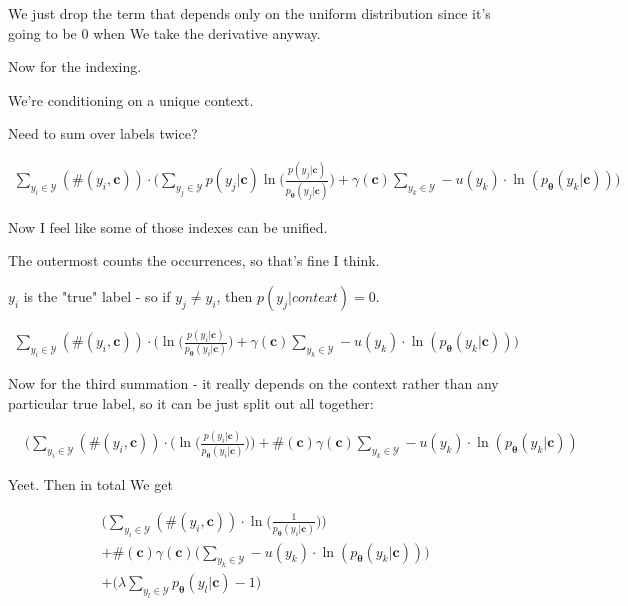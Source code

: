 \documentclass{article}
\newcommand{\vtheta}{\boldsymbol{\theta}}
\newcommand{\model}{p_{\vtheta}}
\newcommand{\context}{\boldsymbol{c}}
\begin{document}
		We just drop the term that depends only on the uniform distribution since it's going to be 0 when We take the derivative anyway.
		
		Now for the indexing. 
		
		We're conditioning on a unique context.
		
		Need to sum over labels twice?
		
		\begin{align}
			\sum_{y_i\in\mathcal{Y}} (\#(y_i, \context))\cdot \bigg( \sum_{y_j\in\mathcal{Y}} p(y_j|\context)\ln\bigg(\frac{p(y_j|\context)}{\model(y_j|\context)} \bigg) + \gamma(\context)\sum_{y_k\in\mathcal{Y}} - u(y_k)\cdot\ln(\model(y_k|\context)) \bigg)
		\end{align}	
		
		Now I feel like some of those indexes can be unified.
		
		The outermost counts the occurrences, so that's fine I think.
		
		$y_i$ is the "true" label - so if $y_j\neq y_i$, then $p(y_j|context) = 0$. 
		
		\begin{align}
			\sum_{y_i\in\mathcal{Y}} (\#(y_i, \context))\cdot \bigg(  \ln\bigg(\frac{p(y_i|\context)}{\model(y_i|\context)} \bigg) + \gamma(\context)\sum_{y_k\in\mathcal{Y}} - u(y_k)\cdot\ln(\model(y_k|\context)) \bigg)
		\end{align}		
			
		Now for the third summation - it really depends on the context rather than any particular true label, so it can be just split out all together:
		
		\begin{align}
			&\bigg(\sum_{y_i\in\mathcal{Y}} (\#(y_i, \context))\cdot \bigg( \ln\bigg(\frac{p(y_i|\context)}{\model(y_i|\context)} \bigg)\bigg) + \#(\context)\gamma(\context)\sum_{y_k\in\mathcal{Y}} - u(y_k)\cdot\ln(\model(y_k|\context)) 
		\end{align}	
		
		Yeet. Then in total We get 
		
		\begin{align}
			&\bigg(\sum_{y_i\in\mathcal{Y}} (\#(y_i, \context))\cdot  \ln\bigg(\frac{1}{\model(y_i|\context)} 	\bigg)\bigg) \\
			&+ \#(\context)\gamma(\context)\bigg(\sum_{y_k\in\mathcal{Y}} - u(y_k)\cdot\ln(\model(y_k|\context))\bigg) \\
			&+ \bigg(\lambda\sum_{y_l\in\mathcal{Y}} \model(y_l|\context) -1\bigg) 
		\end{align}	
		
\end{document}
